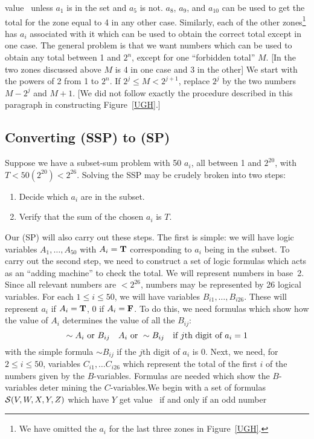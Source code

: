 value \T\ unless $a_1$ is in the set and $a_5$ is not.  $a_8$,
$a_9$, and $a_{10}$ can be used to get the total for the zone
equal to 4 in any other case.
\pq Similarly, each of the other zones\footnote{
We have omitted the $a_i$ for the last three zones in Figure~\ref{UGH}. }
 has $a_i$ associated with
it which can be used to obtain the correct total except in one case.
\pq The general problem is that we want numbers which can be used to
obtain any total between 1 and $2^n$, except for one ``forbidden
total'' $M$.  [In the two zones discussed above $M$ is 4 in one
case and 3 in the other] We start with the powers of 2 from 1 to
$2^n$.  If $2^j\le M<2^{j+1}$, replace $2^j$ by the two numbers
$M-2^j$ and $M+1$.
[We did not follow exactly the procedure described in this paragraph
in constructing Figure~\ref{UGH}.]
\subsection{Converting (SSP) to (SP)}\label{S}
Suppose we have a subset-sum problem with 50 $a_i$, all between 1
and $2^{20}$, with $T<50(2^{20})<2^{26}$.  Solving the SSP may be
crudely broken into two steps:\begin{enumerate}\item Decide which
$a_i$ are in the subset.\item Verify that the sum of the chosen $a_i$ is $T$.
\end{enumerate}Our (SP) will also carry out these steps.  The first
is simple: we will have logic variables $A_1,\dots,A_{50}$ with $A_i={\bf T}$
corresponding to $a_i$ being in the subset.  To carry out the second step,
we need to construct a set of logic formulas which acts as an ``adding
machine'' to check the total.
\pq We will represent numbers in base~2.  Since all relevant numbers are
$<2^{26}$, numbers may be represented by 26 logical variables.  For each
$1\le i\le50$, we will have variables $B_{i1},\dots,B_{i26}$.
These will represent
$a_i$ if $A_i={\bf T}$, 0 if $A_i={\bf F}$.  To do this, we need formulas which show
how the value of $A_i$ determines the value of all the $B_{ij}$:
$$\sim A_i\hbox{ or } B_{ij}\quad A_i\hbox{ or }\sim B_{ij}
\hbox{\quad if $j$th digit of $a_i=1$}$$ with the simple formula $\sim B_{ij}$
if the $j$th digit of $a_i$ is 0.
\pq Next, we need, for $2\le i\le 50$, variables $C_{i1},\dots C_{i26}$
which represent the total of the first $i$ of the numbers given by the
$B$-variables.  Formulas are needed which show the $B$-variables deter%
mining the $C$-variables.\pq We begin with a set of formulas 
${\cal S}(V,W,X,Y,Z)$ which have $Y$ get value \T\ if and only if an odd number
